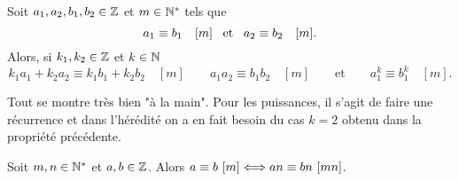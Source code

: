 \documentclass{magnolia}
\begin{document}
\begin{proposition}
Soit $a_1,a_2,b_1,b_2\in\mathbb{Z}$ et $m\in{\mathbb{N}^*}$ tels que
\[a_1\equiv b_1 \quad [m] \quad\!\text{et}\quad\! a_2\equiv b_2 \quad [m].\]
Alors, si $k_1,k_2\in\mathbb{Z}$ et $k\in\mathbb{N}$
\[k_1a_1+k_2a_2\equiv k_1b_1+k_2b_2 \quad [m] \qquad
  a_1a_2\equiv b_1b_2 \quad [m] \qquad\text{et}\qquad
  a_1^k\equiv b_1^k \quad [m].\]
\end{proposition}

\begin{preuve}
Tout se montre très bien "à la main". Pour les puissances, il s'agit de faire une récurrence et dans l'hérédité on a en fait besoin du cas $k=2$ obtenu dans la propriété précédente.
\end{preuve}

\begin{remarqueUnique}
\remarque Soit $m,n\in{\mathbb{N}^*}$ et $a,b\in\mathbb{Z}$. Alors
  $a\equiv b\ [m] \Longleftrightarrow an\equiv bn\ [mn]$.
\end{remarqueUnique}
\end{document}
